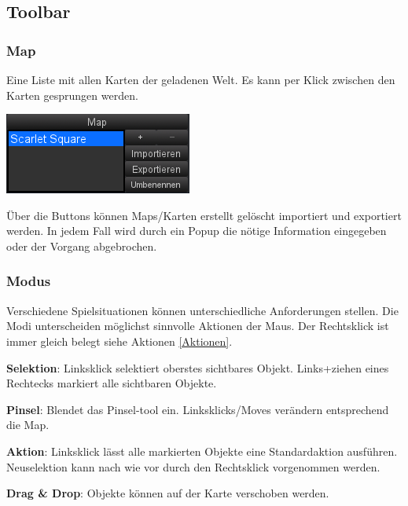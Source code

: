\documentclass[german,10pt,a4paper,twocolumn,colorscheme=darkblue]{orarticle}
\begin{document}
		\subsection{Toolbar}
		\subsubsection*{Map}
			Eine Liste mit allen Karten der geladenen Welt. Es kann per Klick zwischen den Karten gesprungen werden.
			
			\begin{center}
			\includegraphics[width=0.7\linewidth]{img/map}
			\end{center}
			
			Über die Buttons können Maps/Karten erstellt gelöscht importiert und exportiert werden. In jedem Fall wird durch ein Popup die nötige Information eingegeben oder der Vorgang abgebrochen.
		\subsubsection*{Modus}
			Verschiedene Spielsituationen können unterschiedliche Anforderungen stellen. Die Modi unterscheiden möglichst sinnvolle Aktionen der Maus. Der Rechtsklick ist immer gleich belegt siehe Aktionen \ref{Aktionen}.
			
			\textbf{Selektion}: Linksklick selektiert oberstes sichtbares Objekt. Links+ziehen eines Rechtecks markiert alle sichtbaren Objekte.
			
			\textbf{Pinsel}: Blendet das Pinsel-tool ein. Linksklicks/Moves verändern entsprechend die Map.
			
			\textbf{Aktion}: Linksklick lässt alle markierten Objekte eine Standardaktion ausführen. Neuselektion kann nach wie vor durch den Rechtsklick vorgenommen werden.
			
			\textbf{Drag \& Drop}: Objekte können auf der Karte verschoben werden.
						
\end{document}
